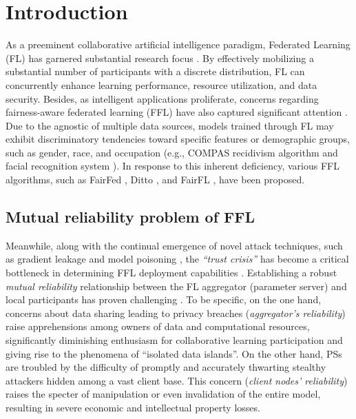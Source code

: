 \documentclass[lettersize,journal]{IEEEtran}
\begin{document}
\section{Introduction}
As a preeminent collaborative artificial intelligence paradigm, Federated Learning (FL) has garnered substantial research focus \cite{ETT2}. 
By effectively mobilizing a substantial number of participants with a discrete distribution, FL can concurrently enhance learning performance, resource utilization, and data security. 
Besides, as intelligent applications proliferate, concerns regarding fairness-aware federated learning (FFL) have also captured significant attention \cite{zhou2021towards-KDDtutorial-FFL}. Due to the agnostic of multiple data sources, models trained through FL may exhibit discriminatory tendencies toward specific features or demographic groups, such as gender, race, and occupation (e.g., COMPAS recidivism algorithm \cite{angwin2022machine} and facial recognition system \cite{raji2019actionable}). In response to this inherent deficiency, various FFL algorithms, such as FairFed \cite{ezzeldin2023fairfed}, Ditto \cite{li2021ditto}, and FairFL \cite{zhang2020fairfl}, have been proposed.

\subsection{Mutual reliability problem of FFL}
Meanwhile, along with the continual emergence of novel attack techniques, such as gradient leakage and model poisoning \cite{fang2020local}, the \textit{``trust crisis''} \cite{zhou2022multi} has become a critical bottleneck in determining FFL deployment capabilities \cite{rodriguez2023survey}. Establishing a robust \textit{mutual reliability} relationship between the FL aggregator (parameter server) and local participants has proven challenging \cite{zhou2022multi}. To be specific, on the one hand, concerns about data sharing leading to privacy breaches (\textit{aggregator's reliability}) \cite{wang2021variational} raise apprehensions among owners of data and computational resources, significantly diminishing enthusiasm for collaborative learning participation and giving rise to the phenomena of ``isolated data islands''. On the other hand, PSs are troubled by the difficulty of promptly and accurately thwarting stealthy attackers hidden among a vast client base. This concern  (\textit{client nodes' reliability}) raises the specter of manipulation or even invalidation of the entire model, resulting in severe economic and intellectual property losses. 
\end{document}
